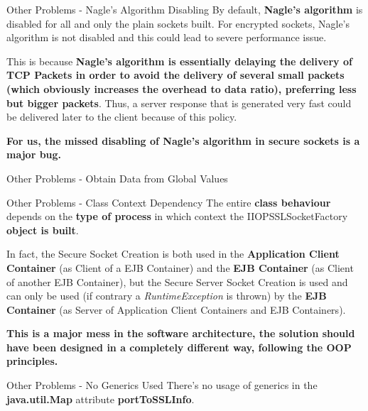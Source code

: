 \documentclass{../common/latex_classes/pdf_presentation}
\begin{document}
	\begin{frame}{Other Problems - Nagle’s Algorithm Disabling}
		By default, \textbf{Nagle’s algorithm} is disabled for all and only the plain sockets built. For encrypted sockets, Nagle’s algorithm is not disabled and this could lead to severe performance issue. \par This is because \textbf{Nagle’s algorithm is essentially delaying the delivery of TCP Packets in order to avoid the delivery of several small packets (which obviously increases the overhead to data ratio), preferring less but bigger packets}. Thus, a server response that is generated very fast could be delivered later to the client because of this policy. \par \textbf{For us, the missed disabling of Nagle’s algorithm in secure sockets is a major bug.}
	\end{frame}

	\begin{frame}{Other Problems - Obtain Data from Global Values}
	\end{frame}
	
	\begin{frame}{Other Problems - Class Context Dependency}
		The entire \textbf{class behaviour} depends on the \textbf{type of process} in which context the IIOPSSLSocketFactory \textbf{object is built}. \par In fact, the Secure Socket Creation is both used in the \textbf{Application Client Container} (as Client of a EJB Container) and the \textbf{EJB Container} (as Client of another EJB Container), but the Secure Server Socket Creation is used and can only be used (if contrary a \textit{RuntimeException} is thrown) by the \textbf{EJB Container} (as Server of Application Client Containers and EJB Containers). \par \textbf{This is a major mess in the software architecture, the solution should have been designed in a completely different way, following the OOP principles.}
	\end{frame}
	
	\begin{frame}{Other Problems - No Generics Used}
		There’s no usage of generics in the \textbf{java.util.Map} attribute \textbf{portToSSLInfo}.%
	\end{frame}
\end{document}
